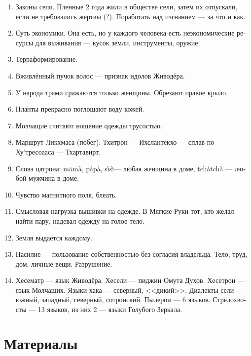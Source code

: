 \documentclass[a4paper,12pt,fleqn]{book}\usepackage{cooltooltips}\usepackage{polyglossia}\setdefaultlanguage[babelshorthands=true]{russian}\setotherlanguage{english}\defaultfontfeatures{Ligatures=TeX,Mapping=tex-text} \usepackage{xcolor}\definecolor{lightgray}{HTML}{bbbbbb}\color{lightgray}\newcommand{\ml}[3]{\textenglish{\textcolor{black}{#3}}}
\begin{document}
{\begin{enumerate}
\item Законы сели.
Пленные 2 года жили в обществе сели, затем их отпускали, если не требовались жертвы (?).
Поработать над изгнанием --- за что и как.

\item Суть экономики.
Она есть, но у каждого человека есть неэкономические ресурсы для выживания --- кусок земли, инструменты, оружие.

\item Терраформирование.

\item Вживлённый пучок волос --- признак идолов Живодёра.

\item У народа трами сражаются только женщины.
Обрезают правое крыло.

\item Планты прекрасно поглощают воду кожей.

\item Молчащие считают ношение одежды трусостью.

\item Маршрут Ликхмаса (побег): Тхитрон --- Ихслантекхо --- сплав по Ху'тресоааса --- Тхартавирт.

\item Слова цатрона: m\=am\`a, p\r{a}p\`a, s\r{\i}s\`\i --- любая женщина в доме, tch\'atch\`a --- любой мужчина в доме.

\item Чувство магнитного поля, блеать.

\item Смысловая нагрузка вышивки на одежде.
В Мягкие Руки тот, кто желал найти пару, надевал одежду на голое тело.

\item Земля выдаётся каждому.

\item Насилие --- пользование собственностью без согласия владельца.
Тело, труд, дом, личные вещи.
Разрушение.

\item Хесематр --- язык Живодёра.
Хесели --- пиджин Омута Духов.
Хесетрон --- язык Молчащих.
Языки хака --- северный, <<дикий>>.
Диалекты сели --- южный, западный, северный, сотронский.
Пылерои --- 6 языков. Стрелохвосты --- 13 языков, из них 2 --- языки Голубого Зеркала.
\end{enumerate}

\section{Материалы}

}
\end{document}
